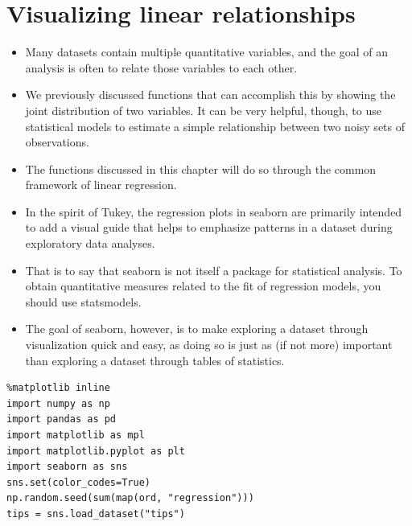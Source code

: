 \documentclass{beamer}
\begin{document}
\section{Visualizing linear relationships}
\begin{frame}
	\begin{itemize}
		\item
		Many datasets contain multiple quantitative variables, and the goal of an analysis is often to relate those variables to each other. \item We previously discussed functions that can accomplish this by showing the joint distribution of two variables. It can be very helpful, though, to use statistical models to estimate a simple relationship between two noisy sets of observations. \item The functions discussed in this chapter will do so through the common framework of linear regression.
		\end{itemize}
\end{frame}
\begin{frame}
	\begin{itemize}
\item In the spirit of Tukey, the regression plots in seaborn are primarily intended to add a visual guide that helps to emphasize patterns in a dataset during exploratory data analyses. 
\item That is to say that seaborn is not itself a package for statistical analysis. To obtain quantitative measures related to the fit of regression models, you should use statsmodels. 
\item The goal of seaborn, however, is to make exploring a dataset through visualization quick and easy, as doing so is just as (if not more) important than exploring a dataset through tables of statistics.
	\end{itemize}

\end{frame}
\begin{frame}[fragile]
	\begin{verbatim}
%matplotlib inline
import numpy as np
import pandas as pd
import matplotlib as mpl
import matplotlib.pyplot as plt
import seaborn as sns
sns.set(color_codes=True)
np.random.seed(sum(map(ord, "regression")))
tips = sns.load_dataset("tips")
	\end{verbatim}

\end{frame}
\end{document}
